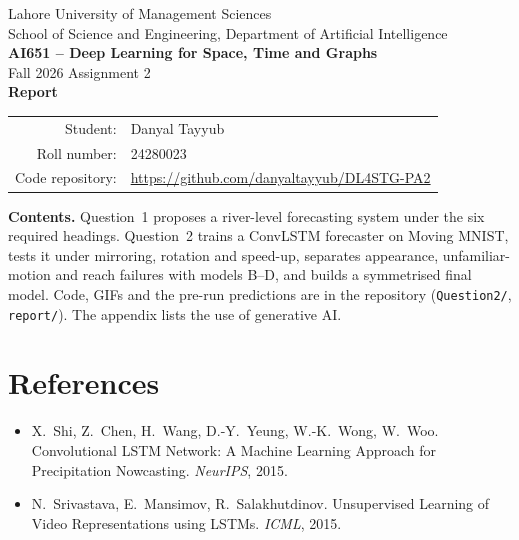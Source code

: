 \documentclass[10pt,a4paper]{article}
\begin{document}
\begin{titlepage}
\centering
{\large Lahore University of Management Sciences}\\[2pt]
School of Science and Engineering, Department of Artificial Intelligence\\[14pt]
{\Large \textbf{AI651 -- Deep Learning for Space, Time and Graphs}}\\[6pt]
{\large Fall 2026 \quad\textbullet\quad Assignment 2}\\[40pt]
{\Large \textbf{Report}}\\[30pt]
\begin{tabular}{rl}
Student: & Danyal Tayyub \\
Roll number: & 24280023 \\
Code repository: & \url{https://github.com/danyaltayyub/DL4STG-PA2} \\
\end{tabular}
\vfill
\begin{minipage}{0.86\textwidth}
\small
\textbf{Contents.} Question~1 proposes a river-level forecasting system under the six required headings.
Question~2 trains a ConvLSTM forecaster on Moving MNIST, tests it under mirroring, rotation and speed-up,
separates appearance, unfamiliar-motion and reach failures with models B--D, and builds a symmetrised final
model. Code, GIFs and the pre-run predictions are in the repository (\texttt{Question2/}, \texttt{report/}).
The appendix lists the use of generative AI.
\end{minipage}
\vspace{20pt}
\end{titlepage}

\renewcommand{\thefigure}{Q1.\arabic{figure}}

\clearpage
\setcounter{figure}{0}\setcounter{table}{0}
\renewcommand{\thefigure}{\arabic{figure}}


\clearpage
\appendix


\section*{References}
\small
\begin{itemize}[leftmargin=*]
\item X.~Shi, Z.~Chen, H.~Wang, D.-Y.~Yeung, W.-K.~Wong, W.~Woo. Convolutional LSTM Network: A Machine
Learning Approach for Precipitation Nowcasting. \textit{NeurIPS}, 2015.
\item N.~Srivastava, E.~Mansimov, R.~Salakhutdinov. Unsupervised Learning of Video Representations using
LSTMs. \textit{ICML}, 2015.
\end{itemize}
\end{document}
